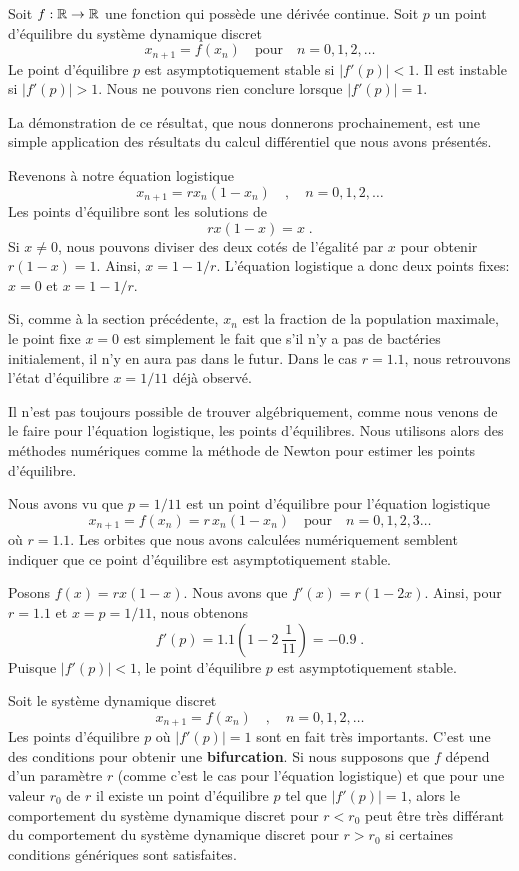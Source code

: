 {\begin{focus}{\thm} \label{sdd_stab_th}
Soit $f:\mathbb{R} \to \mathbb{R}$ une fonction qui possède une dérivée continue.
Soit $p$ un point d'équilibre du système dynamique discret
\[
x_{n+1}=f(x_n) \quad \text{pour} \quad n=0, 1, 2, \ldots
\]
Le point d'équilibre $p$ est asymptotiquement stable si
$|f'(p)| < 1$.  Il est instable si $|f'(p)|>1$.  Nous ne pouvons rien
conclure lorsque $|f'(p)|=1$.
\end{focus}

La démonstration de ce résultat, que nous donnerons prochainement, est
une simple application des résultats du calcul différentiel que nous
avons présentés.

Revenons à notre équation logistique
\[
x_{n+1} = r x_n (1-x_n) \quad , \quad n=0,1,2,\ldots
\]
Les points d'équilibre sont les solutions de
\[
r x (1-x) = x \; .
\]
Si $x\neq 0$, nous pouvons diviser des deux cotés de l'égalité par $x$ pour
obtenir $r (1-x)=1$.  Ainsi, $x = 1 - 1/r$.  L'équation logistique a
donc deux points fixes: $x=0$ et $x=1-1/r$.

Si, comme à la section précédente, $x_n$ est la fraction de la
population maximale, le point fixe $x=0$ est simplement le fait que
s'il n'y a pas de bactéries initialement, il n'y en aura pas dans le
futur.   Dans le cas $r=1.1$, nous retrouvons l'état d'équilibre $x=1/11$
déjà observé.

Il n'est pas toujours possible de trouver algébriquement, comme nous
venons de le faire pour l'équation logistique, les points
d'équilibres.  Nous utilisons alors des méthodes numériques comme la
méthode de Newton pour estimer les points d'équilibre.

\begin{egg}
Nous avons vu que $p= 1/11$ est un point d'équilibre pour l'équation
logistique
\[
x_{n+1} = f(x_n) = r\, x_n (1-x_n) \quad \text{pour} \quad n=0, 1, 2, 3 \ldots
\]
où $r=1.1$.  Les orbites que nous avons calculées numériquement semblent
indiquer que ce point d'équilibre est asymptotiquement stable.

Posons $f(x) = r x (1-x)$.  Nous avons que $f'(x) = r(1-2x)$.  Ainsi, pour
$r=1.1$ et $x = p = 1/11$, nous obtenons
\[
f'(p) = 1.1 \left( 1 - 2\,\frac{1}{11}\right) = -0.9 \; .
\]
Puisque $|f'(p)|<1$, le point d'équilibre $p$ est asymptotiquement
stable.
\end{egg}

\begin{rmk}
Soit le système dynamique discret
\[
x_{n+1} = f(x_n) \quad , \quad n=0, 1, 2, \ldots
\]
Les points d'équilibre $p$ où $|f'(p)|=1$ sont en fait très
importants.  C'est une des conditions pour obtenir une
{\bfseries bifurcation}.  Si nous supposons que $f$ dépend d'un paramètre
$r$ (comme c'est le cas pour l'équation logistique) et que pour une
valeur $r_0$ de $r$ il existe un point d'équilibre $p$ tel que
$|f'(p)|=1$, alors le comportement du système dynamique discret pour
$r<r_0$ peut être très différant du comportement du système dynamique
discret pour $r>r_0$ si certaines conditions génériques sont
satisfaites.


\end{rmk}}
